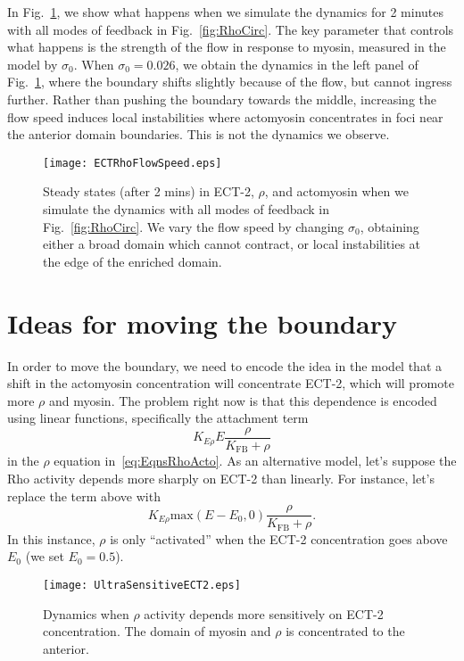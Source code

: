 \documentclass[11pt]{article}
\begin{document}
In Fig.\ \ref{fig:ECTFlowSpeed}, we show what happens when we simulate the dynamics for 2 minutes with all modes of feedback in Fig.\ \ref{fig:RhoCirc}. The key parameter that controls what happens is the strength of the flow in response to myosin, measured in the model by $\sigma_0$. When $\sigma_0=0.026$, we obtain the dynamics in the left panel of Fig.\ \ref{fig:ECTFlowSpeed}, where the boundary shifts slightly because of the flow, but cannot ingress further. Rather than pushing the boundary towards the middle, increasing the flow speed induces local instabilities where actomyosin concentrates in foci near the anterior domain boundaries. This is not the dynamics we observe. 

\begin{figure}
\centering
\texttt{[image: ECTRhoFlowSpeed.eps]}
\caption{\label{fig:ECTFlowSpeed} Steady states (after 2 mins) in ECT-2, $\rho$, and actomyosin when we simulate the dynamics with all modes of feedback in Fig.\ \ref{fig:RhoCirc}. We vary the flow speed by changing $\sigma_0$, obtaining either a broad domain which cannot contract, or local instabilities at the edge of the enriched domain.}
\end{figure}


\section{Ideas for moving the boundary}
In order to move the boundary, we need to encode the idea in the model that a shift in the actomyosin concentration will concentrate ECT-2, which will promote more $\rho$ and myosin. The problem right now is that this dependence is encoded using linear functions, specifically the attachment term
$$K_{E \rho}E \frac{ \rho}{K_\text{FB}+\rho}$$ 
in the $\rho$ equation in\ \eqref{eq:EqnsRhoActo}. As an alternative model, let's suppose the Rho activity depends more sharply on ECT-2 than linearly. For instance, let's replace the term above with
$$K_{E \rho}\text{max}(E-E_0,0) \frac{ \rho}{K_\text{FB}+\rho}.$$
In this instance, $\rho$ is only ``activated'' when the ECT-2 concentration goes above $E_0$ (we set $E_0=0.5$).
 
\begin{figure}
\centering
\texttt{[image: UltraSensitiveECT2.eps]}
\caption{\label{fig:SensitiveECT2}Dynamics when $\rho$ activity depends more sensitively on ECT-2 concentration. The domain of myosin and $\rho$ is concentrated to the anterior.}
\end{figure}
\end{document}
